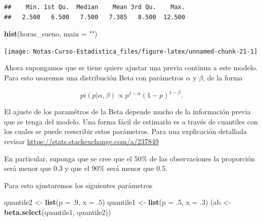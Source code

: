 \documentclass[
  12pt,
]{book}
\newenvironment{Shaded}{\begin{snugshade}}{\end{snugshade}}
\newcommand{\DataTypeTok}[1]{\textcolor[rgb]{0.13,0.29,0.53}{#1}}
\newcommand{\FloatTok}[1]{\textcolor[rgb]{0.00,0.00,0.81}{#1}}
\newcommand{\KeywordTok}[1]{\textcolor[rgb]{0.13,0.29,0.53}{\textbf{#1}}}
\newcommand{\NormalTok}[1]{#1}
\newcommand{\OperatorTok}[1]{\textcolor[rgb]{0.81,0.36,0.00}{\textbf{#1}}}
\newcommand{\StringTok}[1]{\textcolor[rgb]{0.31,0.60,0.02}{#1}}
\begin{document}
\begin{Shaded}
\end{Shaded}

\begin{verbatim}
##    Min. 1st Qu.  Median    Mean 3rd Qu.    Max. 
##   2.500   6.500   7.500   7.385   8.500  12.500
\end{verbatim}

\begin{Shaded}
\begin{Highlighting}[]
\KeywordTok{hist}\NormalTok{(horas\_sueno, }\DataTypeTok{main =} \StringTok{""}\NormalTok{)}
\end{Highlighting}
\end{Shaded}

\begin{center}\texttt{[image: Notas-Curso-Estadistica\_files/figure-latex/unnamed-chunk-21-1]} \end{center}

Ahora supongamos que se tiene quiere ajustar una previa continua a este modelo. Para esto usaremos una distribución Beta con parámetros \(\alpha\) y \(\beta\), de la forma

\[
pi(p\vert \alpha, \beta) \propto p^{1-\alpha} (1-p)^{1-\beta}.
\]

El ajuste de los paramétros de la Beta depende mucho de la información previa que se tenga del modelo. Una forma fácil de estimarlo es a través de cuantiles con los cuales se puede reescribir estos parámetros. Para una explicación detallada revisar \url{https://stats.stackexchange.com/a/237849}

En particular, suponga que se cree que el \(50\%\) de las observaciones la proporción será menor que 0.3 y que el \(90\%\) será menor que 0.5.

Para esto ajustaremos los siguientes parámetros

\begin{Shaded}
\begin{Highlighting}[]
\NormalTok{quantile2 \textless{}{-}}\StringTok{ }\KeywordTok{list}\NormalTok{(}\DataTypeTok{p =} \FloatTok{.9}\NormalTok{, }\DataTypeTok{x =} \FloatTok{.5}\NormalTok{)}
\NormalTok{quantile1 \textless{}{-}}\StringTok{ }\KeywordTok{list}\NormalTok{(}\DataTypeTok{p =} \FloatTok{.5}\NormalTok{, }\DataTypeTok{x =} \FloatTok{.3}\NormalTok{)}
\NormalTok{(ab \textless{}{-}}\StringTok{ }\KeywordTok{beta.select}\NormalTok{(quantile1, quantile2))}
\end{Highlighting}
\end{Shaded}
\end{document}
